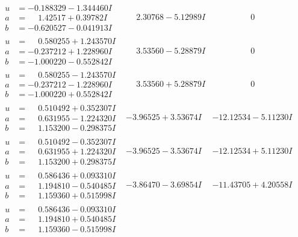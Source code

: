 \documentclass[1p]{elsarticle_modified}
\theoremstyle{definition}
\begin{document}
$$\begin{array}{c|c|c}
\begin{aligned}
u &= -0.188329 - 1.344460 I \\
a &= \phantom{-}1.42517 + 0.39782 I \\
b &= -0.620527 - 0.041913 I\end{aligned}
 & \phantom{-}2.30768 - 5.12989 I & \phantom{-0.000000 } 0 \\ \hline\begin{aligned}
u &= \phantom{-}0.580255 + 1.243570 I \\
a &= -0.237212 + 1.228960 I \\
b &= -1.000220 - 0.552842 I\end{aligned}
 & \phantom{-}3.53560 - 5.28879 I & \phantom{-0.000000 } 0 \\ \hline\begin{aligned}
u &= \phantom{-}0.580255 - 1.243570 I \\
a &= -0.237212 - 1.228960 I \\
b &= -1.000220 + 0.552842 I\end{aligned}
 & \phantom{-}3.53560 + 5.28879 I & \phantom{-0.000000 } 0 \\ \hline\begin{aligned}
u &= \phantom{-}0.510492 + 0.352307 I \\
a &= \phantom{-}0.631955 - 1.224320 I \\
b &= \phantom{-}1.153200 - 0.298375 I\end{aligned}
 & -3.96525 + 3.53674 I & -12.12534 - 5.11230 I \\ \hline\begin{aligned}
u &= \phantom{-}0.510492 - 0.352307 I \\
a &= \phantom{-}0.631955 + 1.224320 I \\
b &= \phantom{-}1.153200 + 0.298375 I\end{aligned}
 & -3.96525 - 3.53674 I & -12.12534 + 5.11230 I \\ \hline\begin{aligned}
u &= \phantom{-}0.586436 + 0.093310 I \\
a &= \phantom{-}1.194810 - 0.540485 I \\
b &= \phantom{-}1.159360 + 0.515998 I\end{aligned}
 & -3.86470 - 3.69854 I & -11.43705 + 4.20558 I \\ \hline\begin{aligned}
u &= \phantom{-}0.586436 - 0.093310 I \\
a &= \phantom{-}1.194810 + 0.540485 I \\
b &= \phantom{-}1.159360 - 0.515998 I\end{aligned}

\end{array}$$
\end{document}
